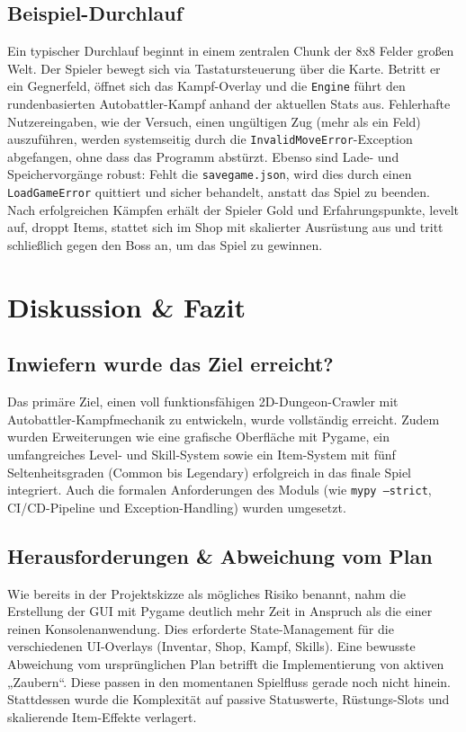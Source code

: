 \documentclass[12pt, a4paper]{article}
\begin{document}
\subsection{Beispiel-Durchlauf}
Ein typischer Durchlauf beginnt in einem zentralen Chunk der 8x8 Felder großen Welt.
Der Spieler bewegt sich via Tastatursteuerung über die Karte.
Betritt er ein Gegnerfeld, öffnet sich das Kampf-Overlay und die \texttt{Engine} führt den rundenbasierten Autobattler-Kampf anhand der aktuellen Stats aus.
Fehlerhafte Nutzereingaben, wie der Versuch, einen ungültigen Zug (mehr als ein Feld) auszuführen, werden systemseitig durch die \texttt{InvalidMoveError}-Exception abgefangen, ohne dass das Programm abstürzt.
Ebenso sind Lade- und Speichervorgänge robust: Fehlt die \texttt{savegame.json}, wird dies durch einen \texttt{LoadGameError} quittiert und sicher behandelt, anstatt das Spiel zu beenden.
Nach erfolgreichen Kämpfen erhält der Spieler Gold und Erfahrungspunkte, levelt auf, droppt Items, stattet sich im Shop mit skalierter Ausrüstung aus und tritt schließlich gegen den Boss an, um das Spiel zu gewinnen.

\section{Diskussion \& Fazit}
\subsection{Inwiefern wurde das Ziel erreicht?}
Das primäre Ziel, einen voll funktionsfähigen 2D-Dungeon-Crawler mit Autobattler-Kampfmechanik zu entwickeln, wurde vollständig erreicht.
Zudem wurden Erweiterungen wie eine grafische Oberfläche mit Pygame, ein umfangreiches Level- und Skill-System sowie ein Item-System mit fünf Seltenheitsgraden (Common bis Legendary) erfolgreich in das finale Spiel integriert.
Auch die formalen Anforderungen des Moduls (wie \texttt{mypy --strict}, CI/CD-Pipeline und Exception-Handling) wurden umgesetzt.

\subsection{Herausforderungen \& Abweichung vom Plan}
Wie bereits in der Projektskizze als mögliches Risiko benannt, nahm die Erstellung der GUI mit Pygame deutlich mehr Zeit in Anspruch als die einer reinen Konsolenanwendung.
Dies erforderte State-Management für die verschiedenen UI-Overlays (Inventar, Shop, Kampf, Skills).
Eine bewusste Abweichung vom ursprünglichen Plan betrifft die Implementierung von aktiven „Zaubern“.
Diese passen in den momentanen Spielfluss gerade noch nicht hinein.
Stattdessen wurde die Komplexität auf passive Statuswerte, Rüstungs-Slots und skalierende Item-Effekte verlagert.
\end{document}
